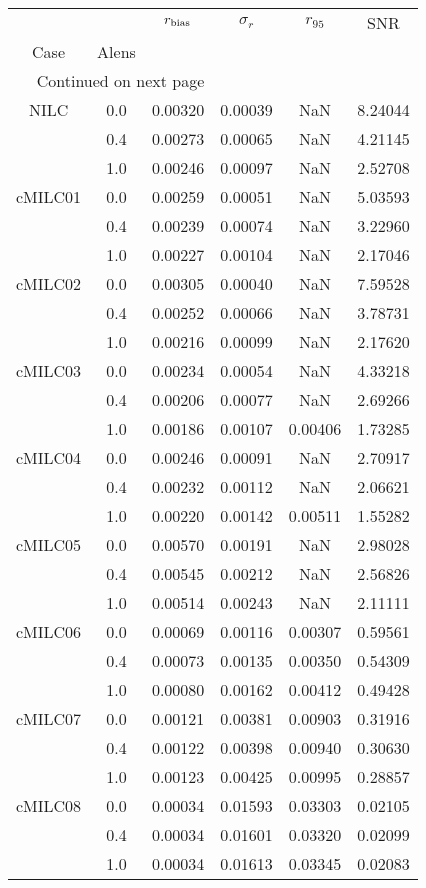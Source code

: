 \begin{longtable}{cccccc}
\toprule
     &     &  $r_{\rm bias}$  &  $\sigma_r$ &  $r_{95}$ &     SNR \\
Case & Alens &                  &             &           &         \\
\midrule
\endhead
\midrule
\multicolumn{3}{r}{{Continued on next page}} \\
\midrule
\endfoot

\bottomrule
\endlastfoot
NILC & 0.0 & 0.00320 & 0.00039 & NaN & 8.24044 \\
     & 0.4 & 0.00273 & 0.00065 & NaN & 4.21145 \\
     & 1.0 & 0.00246 & 0.00097 & NaN & 2.52708 \\
cMILC01 & 0.0 & 0.00259 & 0.00051 & NaN & 5.03593 \\
     & 0.4 & 0.00239 & 0.00074 & NaN & 3.22960 \\
     & 1.0 & 0.00227 & 0.00104 & NaN & 2.17046 \\
cMILC02 & 0.0 & 0.00305 & 0.00040 & NaN & 7.59528 \\
     & 0.4 & 0.00252 & 0.00066 & NaN & 3.78731 \\
     & 1.0 & 0.00216 & 0.00099 & NaN & 2.17620 \\
cMILC03 & 0.0 & 0.00234 & 0.00054 & NaN & 4.33218 \\
     & 0.4 & 0.00206 & 0.00077 & NaN & 2.69266 \\
     & 1.0 & 0.00186 & 0.00107 & 0.00406 & 1.73285 \\
cMILC04 & 0.0 & 0.00246 & 0.00091 & NaN & 2.70917 \\
     & 0.4 & 0.00232 & 0.00112 & NaN & 2.06621 \\
     & 1.0 & 0.00220 & 0.00142 & 0.00511 & 1.55282 \\
cMILC05 & 0.0 & 0.00570 & 0.00191 & NaN & 2.98028 \\
     & 0.4 & 0.00545 & 0.00212 & NaN & 2.56826 \\
     & 1.0 & 0.00514 & 0.00243 & NaN & 2.11111 \\
cMILC06 & 0.0 & 0.00069 & 0.00116 & 0.00307 & 0.59561 \\
     & 0.4 & 0.00073 & 0.00135 & 0.00350 & 0.54309 \\
     & 1.0 & 0.00080 & 0.00162 & 0.00412 & 0.49428 \\
cMILC07 & 0.0 & 0.00121 & 0.00381 & 0.00903 & 0.31916 \\
     & 0.4 & 0.00122 & 0.00398 & 0.00940 & 0.30630 \\
     & 1.0 & 0.00123 & 0.00425 & 0.00995 & 0.28857 \\
cMILC08 & 0.0 & 0.00034 & 0.01593 & 0.03303 & 0.02105 \\
     & 0.4 & 0.00034 & 0.01601 & 0.03320 & 0.02099 \\
     & 1.0 & 0.00034 & 0.01613 & 0.03345 & 0.02083 \\
\end{longtable}
